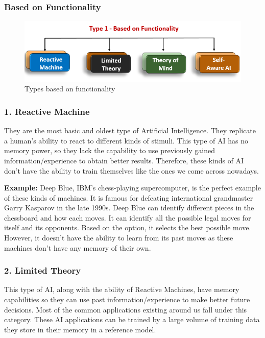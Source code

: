 \subsubsection{Based on Functionality}

\begin{figure}[H]
\centering
\includegraphics[scale=0.618]{pix/basics/Types-of-Artificial-Intelligence-2.3.png}
\caption{Types based on functionality}
\end{figure}


\subsubsection{1. Reactive Machine}

They are the most basic and oldest type of Artificial Intelligence. They replicate 
a human's ability to react to different kinds of stimuli. This type of AI has no 
memory power, so they lack the capability to use previously gained 
information/experience to obtain better results. Therefore, these kinds of AI don't 
have the ability to train themselves like the ones we come across nowadays.

{\bf Example:} Deep Blue, IBM's chess-playing supercomputer, is the perfect example 
of these kinds of machines. It is famous for defeating international grandmaster 
Garry Kasparov in the late 1990s. Deep Blue can identify different pieces in the 
chessboard and how each moves. It can identify all the possible legal moves for 
itself and its opponents. Based on the option, it selects the best possible move. 
However, it doesn't have the ability to learn from its past moves as these machines 
don't have any memory of their own.


\subsubsection{2. Limited Theory}

This type of AI, along with the ability of Reactive Machines, have memory capabilities 
so they can use past information/experience to make better future decisions. Most of 
the common applications existing around us fall under this category. These AI 
applications can be trained by a large volume of training data they store in their 
memory in a reference model.

